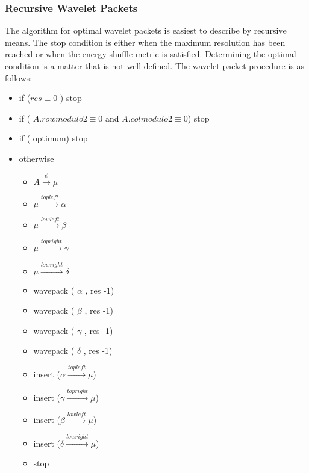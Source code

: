 \subsubsection{Recursive Wavelet Packets}
The algorithm for optimal wavelet packets is easiest to describe by recursive means.  The stop condition is either when the maximum resolution has been reached or when the energy shuffle metric is satisfied.  Determining the optimal condition is a matter that is not well-defined.  The wavelet packet procedure is as follows: \\
\begin{itemize}\item if ($res \equiv 0$  ) stop
\item if ( $A.row {modulo} 2 \equiv  0$ and $A.col {modulo} 2 \equiv 0$) stop
\item if ( optimum) stop
\item otherwise 
\begin{itemize}\item $A \stackrel{\psi}{\to} \mu $
\item $\mu \stackrel{topleft}{\to} \alpha$
\item $\mu \stackrel{lowleft}{\to} \beta$
\item $\mu \stackrel{topright}{\to} \gamma$
\item $\mu \stackrel{lowright}{\to} \delta$
\item wavepack ( $\alpha$ , res -1)
\item wavepack ( $\beta$ , res -1)
\item wavepack ( $\gamma$ , res -1)
\item wavepack ( $\delta$ , res -1)
\item insert ($\alpha  \stackrel{topleft}{\to} \mu$)
\item insert ($\gamma  \stackrel{topright}{\to} \mu$)
\item insert ($\beta  \stackrel{lowleft}{\to} \mu$)
\item insert ($\delta  \stackrel{lowright}{\to} \mu$)
\item stop\end{itemize}\end{itemize}%




